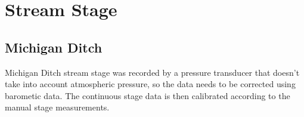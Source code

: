 \documentclass[
]{book}
\begin{document}
\hypertarget{stream-stage}{%
\section{Stream Stage}\label{stream-stage}}

\hypertarget{michigan-ditch}{%
\subsection*{Michigan Ditch}\label{michigan-ditch}}

Michigan Ditch stream stage was recorded by a pressure transducer that doesn't take into account atmospheric pressure, so the data needs to be corrected using barometic data. The continuous stage data is then calibrated according to the manual stage measurements.
\end{document}

